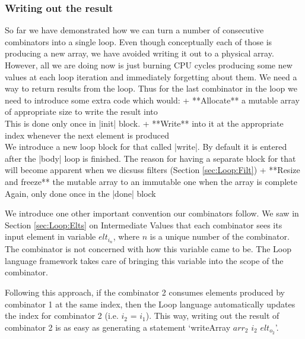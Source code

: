 \subsubsection{Writing out the result}

So far we have demonstrated how we can turn a number of consecutive combinators into a single loop. Even though conceptually each of those is producing a new array, we have avoided writing it out to a physical array. However, all we are doing now is just burning CPU cycles producing some new values at each loop iteration and immediately forgetting about them. We need a way to return results from the loop. Thus for the last combinator in the loop we need to introduce some extra code which would:
+ **Allocate** a mutable array of appropriate size to write the result into\\
  This is done only once in |init| block.
+ **Write** into it at the appropriate index whenever the next element is produced\\
  We introduce a new loop block for that called |write|. By default it is entered after the |body| loop is finished. The reason for having a separate block for that will become apparent when we dicsuss filters (Section \ref{sec:Loop:Filt})
+ **Resize and freeze** the mutable array to an immutable one when the array is complete\\
  Again, only done once in the |done| block

We introduce one other important convention our combinators follow. We saw in Section \ref{sec:Loop:Elts} on Intermediate Values that each combinator sees its input element in variable $elt_{i_n}$, where $n$ is a unique number of the combinator. The combinator is not concerned with how this variable came to be. The Loop language framework takes care of bringing this variable into the scope of the combinator.

Following this approach, if the combinator 2 consumes elements produced by combinator 1 at the same index, then the Loop language automatically updates the index for combinator 2 (i.e. $i_2$ = $i_1$). This way, writing out the result of combinator 2 is as easy as generating a statement `writeArray $arr_2$ $i_2$ $elt_{o_2}$'.

